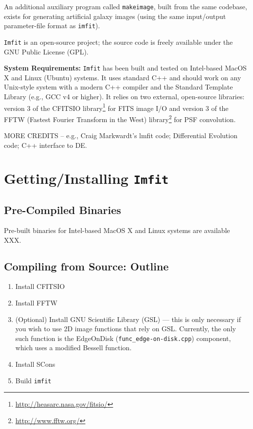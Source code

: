 \documentclass[10pt]{article}
\newcommand{\imfit}{\texttt{imfit}}
\newcommand{\Imfit}{\texttt{Imfit}}
\newcommand{\makeimage}{\texttt{makeimage}}
\begin{document}
An additional auxiliary program called \makeimage{}, built from the same
codebase, exists for generating artificial galaxy images (using the same
input/output parameter-file format as \imfit{}).

\Imfit{} is an open-source project; the source code is freely available
under the GNU Public License (GPL).


\bigskip

\textbf{System Requirements:} \Imfit{} has been built and tested on
Intel-based MacOS X and Linux (Ubuntu) systems. It uses standard C++ and
should work on any Unix-style system with a modern C++ compiler and the
Standard Template Library (e.g., GCC v4 or higher). It relies on two
external, open-source libraries: version 3 of the CFITSIO
library\footnote{\url{http://heasarc.nasa.gov/fitsio/}} for FITS image I/O and
version 3 of the FFTW (Fastest Fourier Transform in the West)
library\footnote{\url{http://www.fftw.org/}} for PSF convolution.

MORE CREDITS -- e.g., Craig Markwardt's lmfit code; Differential Evolution
code; C++ interface to DE.



\section{Getting/Installing \Imfit{}}

\subsection{Pre-Compiled Binaries}

Pre-built binaries for Intel-based MacOS X and Linux systems are available XXX.


\subsection{Compiling from Source: Outline}

\begin{enumerate}
\item Install CFITSIO

\item Install FFTW

\item (Optional) Install GNU Scientific Library (GSL) --- this is only necessary
if you wish to use 2D image functions that rely on GSL.  Currently, the only
such function is the EdgeOnDisk (\texttt{func\_edge-on-disk.cpp}) component, which
uses a modified Bessell function.

\item Install SCons

\item Build \imfit{}

\end{enumerate}
\end{document}
